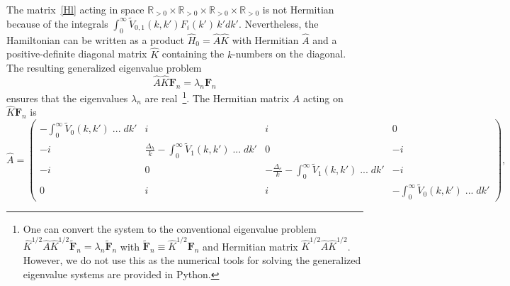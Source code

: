 \documentclass[
aps,
prl,
groupedaddress,
superscriptaddress,
floatfix,
notitlepage
]{revtex4-1}
\begin{document}
The matrix~\eqref{Hl} acting in space $\mathbb{R}_{>0}\times \mathbb{R}_{>0}\times \mathbb{R}_{>0} \times \mathbb{R}_{>0}$ is not Hermitian because of the integrals $\int_0^\infty \tilde{V}_{0,1}(k,k') F_i(k')\, k'dk'$. Nevertheless, the Hamiltonian can be written as a product
$
\hat{H}_0=\hat{A}\hat{K}
$
with Hermitian $\hat{A}$ and a positive-definite diagonal matrix $\hat{K}$ containing the $k$-numbers on the diagonal. 
The resulting generalized eigenvalue problem
$$
\hat{A}\hat{K} \mathbf{F}_n = \lambda_n \mathbf{F}_n
$$
ensures that 
the eigenvalues $\lambda_n$ are real~\footnote{One can convert the system to the conventional eigenvalue problem 
$\hat{K}^{1/2}\hat{A}\hat{K}^{1/2} \tilde{\mathbf{F}}_n = \lambda_n \tilde{\mathbf{F}}_n$ with $\tilde{\mathbf{F}}_n\equiv \hat{K}^{1/2}\mathbf{F}_n$ and Hermitian matrix $\hat{K}^{1/2}\hat{A}\hat{K}^{1/2}$. However, we do not use this as the numerical tools for solving the generalized eigenvalue systems are provided in Python.}. The Hermitian matrix $A$ acting on  $\hat{K} \mathbf{F}_n$ is
\setlength\arraycolsep{7pt}
\renewcommand*{\arraystretch}{2}
\begin{equation}
\hat{A} =
\begin{pmatrix}
-\int_0^\infty \tilde{V}_0(k,k') \;...\; dk' &  i & i & 0 \\
-i & \frac{\Delta_h}{k}-\int_0^\infty \tilde{V}_1(k,k') \;...\; dk' & 0 & -i \\
-i  & 0 & -\frac{\Delta_e}{k}-\int_0^\infty \tilde{V}_1(k,k') \;...\; dk' & -i \\
0 & i & i & -\int_0^\infty \tilde{V}_0(k,k') \;...\; dk'
\end{pmatrix},
\label{Amatrix}
\end{equation}

\end{document}
